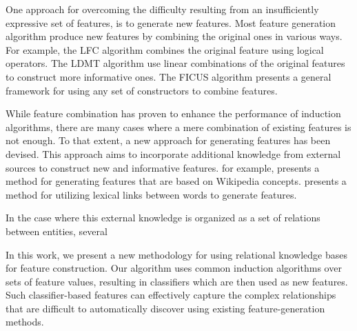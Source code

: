 \documentclass[letterpaper]{article}
\theoremstyle{definition}
\begin{document}
One approach for overcoming the difficulty resulting from an insufficiently expressive set of features, is to generate new features.  Most feature generation algorithm produce new features by combining the original ones in various ways.  For example, the LFC algorithm \cite{ragavan1993complex} combines the original feature using logical operators.  The LDMT algorithm \cite{utgo1991linear} use linear combinations of the original features to construct more informative ones.  The FICUS algorithm \cite{markovitch2002feature} presents a general framework for using any set of constructors to combine features.

While feature combination has proven to enhance the performance of induction algorithms, there are many cases where a mere combination of existing features is not enough.  To that extent, a new approach for generating features has been devised.  This approach aims to incorporate additional knowledge from external sources to construct new and informative features.
\cite{gabrilovich2007computing} for example, presents a method for generating features that are based on Wikipedia concepts.  \cite{jarmasz2004roget} presents a method for utilizing lexical links between words to generate features.

In the case where this external knowledge is organized as a set of relations between entities, several %

In this work, we present a new methodology for using relational knowledge bases for feature construction.  Our algorithm uses common induction algorithms over sets of feature values, resulting in classifiers which are then used as new features.
Such classifier-based features can effectively capture the complex relationships that are difficult to automatically discover using existing feature-generation methods.
\end{document}
